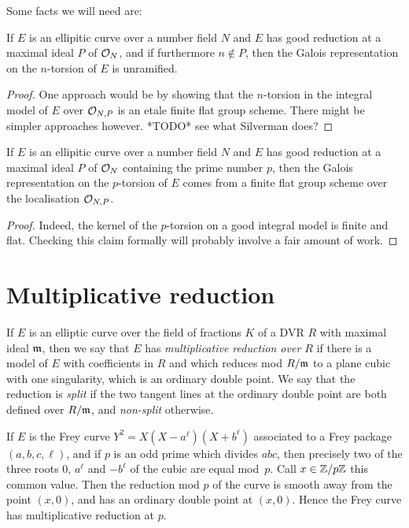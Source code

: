 Some facts we will need are:

\begin{theorem}\label{good_reduction_implies_unramified} If $E$ is an ellipitic curve over a number 
  field $N$ and $E$ has good reduction at a maximal ideal $P$ of $\mathcal{O}_N$, and if furthermore 
  $n\not\in P$, then the Galois representation on the $n$-torsion of $E$ is unramified.
\end{theorem}
\begin{proof}
  One approach would be by showing that the $n$-torsion in the integral model of $E$ over $\mathcal{O}_{N,P}$
  is an etale finite flat group scheme. There might be simpler approaches however.
  *TODO* see what Silverman does?
\end{proof}

\begin{theorem}\label{good_reduction_implies_flat} If $E$ is an ellipitic curve over a number field 
  $N$ and $E$ has good reduction at a maximal ideal $P$ of $\mathcal{O}_N$ containing the prime number $p$, 
  then the Galois representation on the $p$-torsion of $E$ comes from a finite flat group scheme 
  over the localisation $\mathcal{O}_{N,P}$.
\end{theorem}
\begin{proof}
  Indeed, the kernel of the $p$-torsion on a good integral model is finite and flat.
  Checking this claim formally will probably involve a fair amount of work.
\end{proof}

\section{Multiplicative reduction}

If $E$ is an elliptic curve over the field of fractions $K$ of a DVR $R$ with maximal ideal $\mathfrak{m}$,
then we say that $E$ has \emph{multiplicative reduction over $R$} if there is a model of $E$
with coefficients in $R$ and which reduces mod $R/\mathfrak{m}$ to a plane cubic with one singularity, which is an ordinary double point.
We say that the reduction is \emph{split} if the two tangent lines at the ordinary double point
are both defined over $R/\mathfrak{m}$, and \emph{non-split} otherwise.

\begin{example} If $E$ is the Frey curve $Y^2=X(X-a^\ell)(X+b^\ell)$ associated to a Frey
  package $(a,b,c,\ell)$, and if $p$ is an odd prime
  which divides $abc$, then precisely two of the three roots $0$, $a^\ell$ and $-b^\ell$
  of the cubic are equal mod~$p$. Call $x\in\mathbb{Z}/p\mathbb{Z}$ this common value. Then the reduction mod $p$ of 
  the curve is smooth away from the point $(x,0)$,
  and has an ordinary double point at $(x,0)$. Hence the Frey curve has
  multiplicative reduction at $p$.
\end{example}

